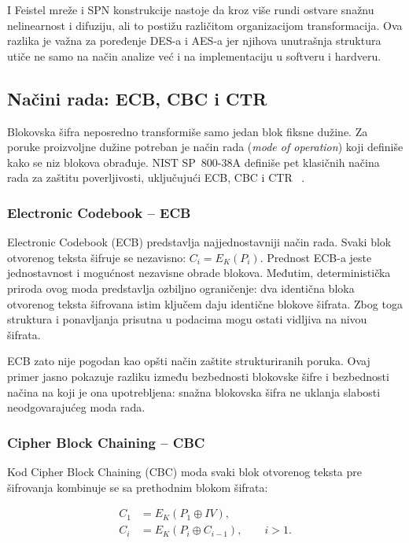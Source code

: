 I Feistel mreže i SPN konstrukcije nastoje da kroz više rundi ostvare
snažnu nelinearnost i difuziju, ali to postižu različitom organizacijom
transformacija. Ova razlika je važna za poređenje DES-a i AES-a jer
njihova unutrašnja struktura utiče ne samo na način analize već i na
implementaciju u softveru i hardveru.


\subsection{Načini rada: ECB, CBC i CTR}
\label{subsec:modovi_rada}

Blokovska šifra neposredno transformiše samo jedan blok fiksne dužine.
Za poruke proizvoljne dužine potreban je način rada
(\emph{mode of operation}) koji definiše kako se niz blokova obrađuje.
NIST SP~800-38A definiše pet klasičnih načina rada za zaštitu
poverljivosti, uključujući ECB, CBC i CTR
~\cite{sp800-38a}.

\subsubsection{Electronic Codebook -- ECB}

Electronic Codebook (ECB) predstavlja najjednostavniji način rada.
Svaki blok otvorenog teksta šifruje se nezavisno:
$C_i = E_K(P_i)$.
Prednost ECB-a jeste jednostavnost i mogućnost nezavisne obrade
blokova. Međutim, deterministička priroda ovog moda predstavlja
ozbiljno ograničenje: dva identična bloka otvorenog teksta šifrovana
istim ključem daju identične blokove šifrata. Zbog toga struktura i
ponavljanja prisutna u podacima mogu ostati vidljiva na nivou
šifrata.

ECB zato nije pogodan kao opšti način zaštite strukturiranih poruka.
Ovaj primer jasno pokazuje razliku između bezbednosti blokovske šifre i
bezbednosti načina na koji je ona upotrebljena: snažna blokovska šifra
ne uklanja slabosti neodgovarajućeg moda rada.


\subsubsection{Cipher Block Chaining -- CBC}

Kod Cipher Block Chaining (CBC) moda svaki blok otvorenog teksta pre
šifrovanja kombinuje se sa prethodnim blokom šifrata:

\begin{align}
    C_1 &= E_K(P_1 \oplus IV), \\
    C_i &= E_K(P_i \oplus C_{i-1}), \qquad i>1.
    \label{eq:cbc}
\end{align}

